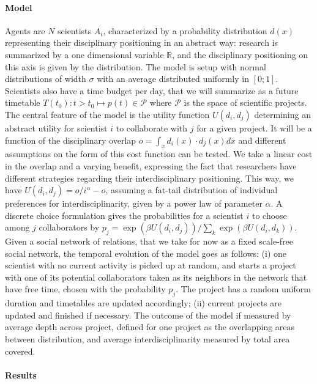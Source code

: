 \paragraph{Model}

Agents are $N$ scientists $A_i$, characterized by a probability distribution $d(x)$ representing their disciplinary positioning in an abstract way: research is summarized by a one dimensional variable $\mathbb{R}$, and the disciplinary positioning on this axis is given by the distribution. The model is setup with normal distributions of width $\sigma$ with an average distributed uniformly in $\left[0;1\right]$. Scientists also have a time budget per day, that we will summarize as a future timetable $T(t_0):t>t_0 \mapsto p(t) \in \mathcal{P}$ where $\mathcal{P}$ is the space of scientific projects. The central feature of the model is the utility function $U(d_i,d_j)$ determining an abstract utility for scientist $i$ to collaborate with $j$ for a given project. It will be a function of the disciplinary overlap $o = \int_x d_i(x)\cdot d_j(x) dx$ and different assumptions on the form of this cost function can be tested. We take a linear cost in the overlap and a varying benefit, expressing the fact that researchers have different strategies regarding their interdisciplinary positioning. This way, we have $U(d_i,d_j) = o / i^\alpha - o$, assuming a fat-tail distribution of individual preferences for interdisciplinarity, given by a power law of parameter $\alpha$. A discrete choice formulation gives the probabilities for a scientist $i$ to choose among $j$ collaborators by $p_j = \exp\left(\beta U(d_i,d_j) \right)/\sum_k \exp\left(\beta U(d_i,d_k) \right)$. Given a social network of relations, that we take for now as a fixed scale-free social network, the temporal evolution of the model goes as follows: (i) one scientist with no current activity is picked up at random, and starts a project with one of its potential collaborators taken as its neighbors in the network that have free time, chosen with the probability $p_j$. The project has a random uniform duration and timetables are updated accordingly; (ii) current projects are updated and finished if necessary. The outcome of the model if measured by average depth across project, defined for one project as the overlapping areas between distribution, and average interdisciplinarity measured by total area covered.


\paragraph{Results}

